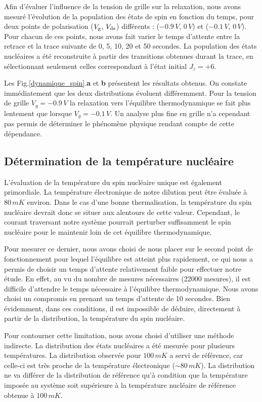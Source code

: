 Afin d'évaluer l'influence de la tension de grille sur la relaxation, nous avons mesuré l'évolution de la population des états de spin en fonction du temps, pour deux points de polarisation ($V_{\rm{g}}$, $V_{\rm{ds}}$) différents : ($-0.9\, V$, $0\, V$) et ($-0.1\, V$, $0\, V$). Pour chacun de ces points, nous avons fait varier le temps d'attente entre la retrace et la trace suivante de 0, 5, 10, 20 et 50 secondes. La population des états nucléaires a été reconstruite à partir des transitions obtenues durant la trace, en sélectionnant seulement celles correspondant à l'état initial $J_z=+6$.

Les Fig.\ref{dynamique_spin}.\textbf{a} et \textbf{b} présentent les résultats obtenus. On constate immédiatement que les deux distributions évoluent différemment. Pour la tension de grille $V_g = -0.9\,V$ la relaxation vers l'équilibre thermodynamique se fait plus lentement que lorsque $V_g = -0.1\,V$. Un analyse plus fine en grille n'a cependant pas permis de déterminer le phénomène physique rendant compte de cette dépendance.

\subsection{Détermination de la température nucléaire}
L'évaluation de la température du spin nucléaire unique est également primordiale. La température électronique de notre dilution peut \^etre évaluée à $80\,mK$ environ. Dans le cas d'une bonne thermalisation, la température du spin nucléaire devrait donc se situer aux alentours de cette valeur. Cependant, le courant traversant notre système pourrait perturber suffisamment le spin nucléaire pour le maintenir loin de cet équilibre thermodynamique. 

Pour mesurer ce dernier, nous avons choisi de nous placer sur le second point de fonctionnement pour lequel l'équilibre est atteint plus rapidement, ce qui nous  a permis de choisir un temps d'attente relativement faible pour effectuer notre étude. En effet, au vu du nombre de mesures nécessaires (22000 mesures), il est difficile d'attendre le temps nécessaire à l'équilibre thermodynamique. Nous avons choisi un compromis en prenant un temps d'attente de 10 secondes. Bien évidemment, dans ces conditions, il est impossible de déduire, directement à partir de la distribution, la température du spin nucléaire.

Pour contourner cette limitation, nous avons choisi d'utiliser une méthode indirecte. La distribution des états nucléaires a été mesurée pour plusieurs températures. La distribution observée pour $100\,mK$ a servi de référence, car celle-ci est très proche de la température électronique ($\sim 80\,mK$). La distribution ne va différer de la distribution de référence qu'à condition que la température imposée au système soit supérieure à la température nucléaire de référence obtenue à $100\,mK$.

